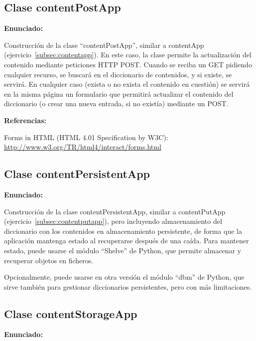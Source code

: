 \subsection{Clase contentPostApp}
\label{subsec:contentpostapp}

\textbf{Enunciado:}

Construcción de la clase ``contentPostApp'', similar a contentApp (ejercicio~\ref{subsec:contentapp}). En este caso, la clase permite la actualización del contenido mediante peticiones HTTP POST. Cuando se reciba un GET pidiendo cualquier recurso, se buscará en el diccionario de contenidos, y si existe, se servirá. En cualquier caso (exista o no exista el contenido en cuestión) se servirá en la misma página un formulario que permitirá actualizar el contenido del diccionario (o crear una nueva entrada, si no existía) mediante un POST.

\textbf{Referencias:}

Forms in HTML (HTML 4.01 Specification by W3C): \\
\url{http://www.w3.org/TR/html4/interact/forms.html}

\subsection{Clase contentPersistentApp}
\label{subsec:contentpersistentapp}

\textbf{Enunciado:}

Construcción de la clase contentPersistentApp, similar a contentPutApp (ejercicio~\ref{subsec:contentputapp}), pero incluyendo almacenamiento del diccionario con los contenidos en almacenamiento persistente, de forma que la aplicación mantenga estado al recuperarse después de una caída. Para mantener estado, puede usarse el módulo ``Shelve'' de Python, que permite almacenar y recuperar objetos en ficheros.

Opcionalmente, puede usarse en otra versión el módulo ``dbm'' de Python, que sirve también para gestionar diccionarios persistentes, pero con más limitaciones.

\subsection{Clase contentStorageApp}
\label{subsec:contentstorageapp}

\textbf{Enunciado:}

